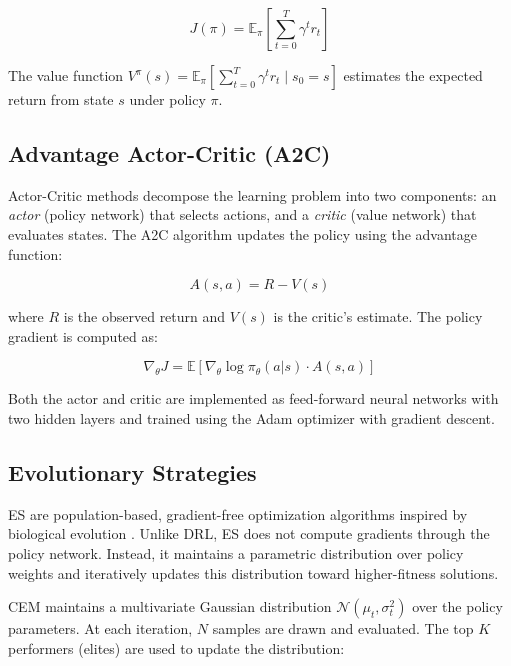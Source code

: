 \documentclass[conference, 10pt]{IEEEtran}
\begin{document}
\begin{equation}
    J(\pi) = \mathbb{E}_{\pi}\left[\sum_{t=0}^{T} \gamma^t r_t\right]
\end{equation}

\noindent The value function $V^\pi(s) = \mathbb{E}_\pi\left[\sum_{t=0}^{T} \gamma^t r_t \mid s_0 = s\right]$ estimates the expected return from state $s$ under policy $\pi$.

\subsection{Advantage Actor-Critic (A2C)}

Actor-Critic methods \cite{grondman2012} decompose the learning problem into two components: an \textit{actor} (policy network) that selects actions, and a \textit{critic} (value network) that evaluates states. The A2C algorithm updates the policy using the advantage function:

\begin{equation}
    A(s, a) = R - V(s)
\end{equation}

\noindent where $R$ is the observed return and $V(s)$ is the critic's estimate. The policy gradient is computed as:

\begin{equation}
    \nabla_\theta J = \mathbb{E}\left[\nabla_\theta \log \pi_\theta(a|s) \cdot A(s, a)\right]
\end{equation}

Both the actor and critic are implemented as feed-forward neural networks with two hidden layers and trained using the Adam optimizer with gradient descent.

\subsection{Evolutionary Strategies}

ES are population-based, gradient-free optimization algorithms inspired by biological evolution \cite{rechenberg1989}. Unlike DRL, ES does not compute gradients through the policy network. Instead, it maintains a parametric distribution over policy weights and iteratively updates this distribution toward higher-fitness solutions.

CEM \cite{hansen2016} maintains a multivariate Gaussian distribution $\mathcal{N}(\mu_t, \sigma_t^2)$ over the policy parameters. At each iteration, $N$ samples are drawn and evaluated. The top $K$ performers (elites) are used to update the distribution:
\end{document}
